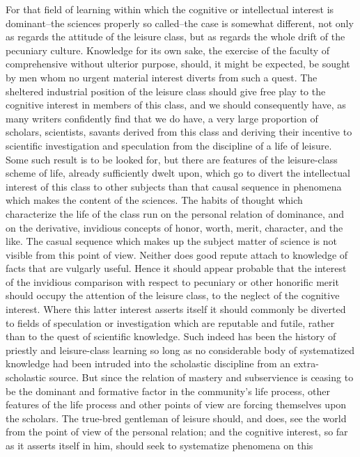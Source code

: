 \documentclass[12pt]{report}
\begin{document}
For that field of learning within which the cognitive or intellectual
interest is dominant--the sciences properly so called--the case is
somewhat different, not only as regards the attitude of the leisure
class, but as regards the whole drift of the pecuniary culture.
Knowledge for its own sake, the exercise of the faculty of comprehensive
without ulterior purpose, should, it might be expected, be sought by
men whom no urgent material interest diverts from such a quest. The
sheltered industrial position of the leisure class should give free
play to the cognitive interest in members of this class, and we should
consequently have, as many writers confidently find that we do have, a
very large proportion of scholars, scientists, savants derived from
this class and deriving their incentive to scientific investigation and
speculation from the discipline of a life of leisure. Some such result
is to be looked for, but there are features of the leisure-class
scheme of life, already sufficiently dwelt upon, which go to divert the
intellectual interest of this class to other subjects than that causal
sequence in phenomena which makes the content of the sciences. The
habits of thought which characterize the life of the class run on
the personal relation of dominance, and on the derivative, invidious
concepts of honor, worth, merit, character, and the like. The casual
sequence which makes up the subject matter of science is not visible
from this point of view. Neither does good repute attach to knowledge of
facts that are vulgarly useful. Hence it should appear probable that the
interest of the invidious comparison with respect to pecuniary or other
honorific merit should occupy the attention of the leisure class, to the
neglect of the cognitive interest. Where this latter interest asserts
itself it should commonly be diverted to fields of speculation or
investigation which are reputable and futile, rather than to the quest
of scientific knowledge. Such indeed has been the history of priestly
and leisure-class learning so long as no considerable body of
systematized knowledge had been intruded into the scholastic discipline
from an extra-scholastic source. But since the relation of mastery and
subservience is ceasing to be the dominant and formative factor in the
community's life process, other features of the life process and other
points of view are forcing themselves upon the scholars. The true-bred
gentleman of leisure should, and does, see the world from the point of
view of the personal relation; and the cognitive interest, so far as
it asserts itself in him, should seek to systematize phenomena on this
\end{document}
